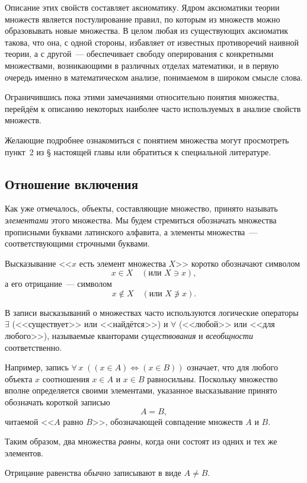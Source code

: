 Описание этих свойств составляет аксиоматику. Ядром аксиоматики теории множеств является постулирование правил, по которым из множеств можно образовывать новые множества. В целом любая из существующих аксиоматик такова, что она, с одной стороны, избавляет от известных противоречий наивной теории, а с другой~--- обеспечивает свободу оперирования с конкретными множествами, возникающими в различных отделах математики, и в первую очередь именно в математическом анализе, понимаемом в широком смысле слова.

Ограничившись пока этими замечаниями относительно понятия множества, перейдём к описанию некоторых наиболее часто используемых в анализе свойств множеств.

Желающие подробнее ознакомиться с понятием множества могут просмотреть пункт~2 из \S{} настоящей главы или обратиться к специальной литературе.

\subsection{Отношение включения}

Как уже отмечалось, объекты, составляющие множество, принято называть \emph{элементами} этого множества. Мы будем стремиться обозначать множества прописными буквами латинского алфавита, а элементы множества~--- соответствующими строчными буквами.

Высказывание <<$x$ есть элемент множества $X$>> коротко обозначают символом
\[
x \in X \quad (\text{или } X \ni x),
\]
а его отрицание~--- символом
\[
x \notin X \quad (\text{или } X \not\ni x).
\]

В записи высказываний о множествах часто используются логические операторы $\exists$ (<<существует>> или <<найдётся>>) и $\forall$ (<<любой>> или <<для любого>>), называемые кванторами \emph{существования} и \emph{всеобщности} соответственно.

Например, запись $\forall\,x\;((x \in A) \Leftrightarrow (x \in B))$ означает, что для любого объекта $x$ соотношения $x \in A$ и $x \in B$ равносильны. Поскольку множество вполне определяется своими элементами, указанное высказывание принято обозначать короткой записью
\[
A = B,
\]
читаемой <<$A$ равно $B$>>, обозначающей совпадение множеств $A$ и $B$.

Таким образом, два множества \emph{равны}, когда они состоят из одних и тех же элементов.

Отрицание равенства обычно записывают в виде $A \neq B$.

